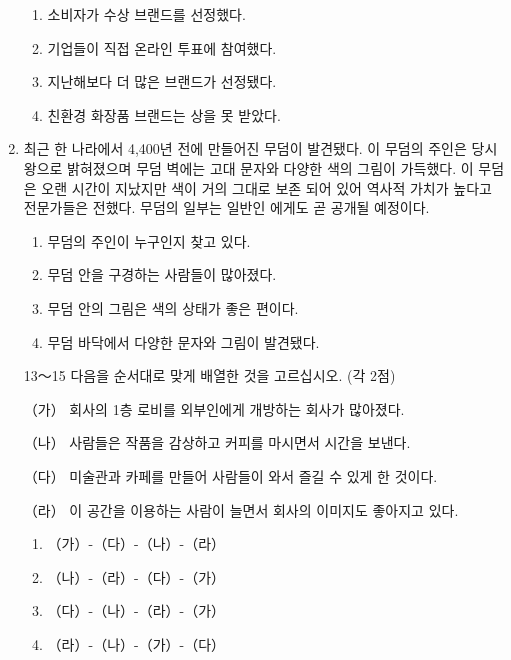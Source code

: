 \documentclass[12pt]{article}
\begin{document}
\begin{enumerate}[1.]
\begin{mdframed}
    \end{mdframed}

    \begin{enumerate}[1)]
        \item 소비자가 수상 브랜드를 선정했다.
        \item 기업들이 직접 온라인 투표에 참여했다.
        \item 지난해보다 더 많은 브랜드가 선정됐다.
        \item 친환경 화장품 브랜드는 상을 못 받았다.
    \end{enumerate}


    \item

    \begin{mdframed}

    최근 한 나라에서 4,400년 전에 만들어진 무덤이 발견됐다. 이 무덤의
    주인은 당시 왕으로 밝혀졌으며 무덤 벽에는 고대 문자와 다양한 색의
    그림이 가득했다. 이 무덤은 오랜 시간이 지났지만 색이 거의 그대로 보존
    되어 있어 역사적 가치가 높다고 전문가들은 전했다. 무덤의 일부는 일반인
    에게도 곧 공개될 예정이다.

    \end{mdframed}

    \begin{enumerate}[1)]
        \item 무덤의 주인이 누구인지 찾고 있다.
        \item 무덤 안을 구경하는 사람들이 많아졌다.
        \item 무덤 안의 그림은 색의 상태가 좋은 편이다.
        \item 무덤 바닥에서 다양한 문자와 그림이 발견됐다.
    \end{enumerate}




    \item [13～15] 다음을 순서대로 맞게 배열한 것을 고르십시오. (각 2점)

    \begin{mdframed}
    （가） 회사의 1층 로비를 외부인에게 개방하는 회사가 많아졌다.

    （나） 사람들은 작품을 감상하고 커피를 마시면서 시간을 보낸다.

    （다） 미술관과 카페를 만들어 사람들이 와서 즐길 수 있게 한 것이다.

    （라） 이 공간을 이용하는 사람이 늘면서 회사의 이미지도 좋아지고 있다.
    \end{mdframed}

    \begin{enumerate}[1)]
        \item （가）-（다）-（나）-（라）
        \item （나）-（라）-（다）-（가）
        \item （다）-（나）-（라）-（가）
        \item （라）-（나）-（가）-（다）
    \end{enumerate}



\end{enumerate}
\end{document}
